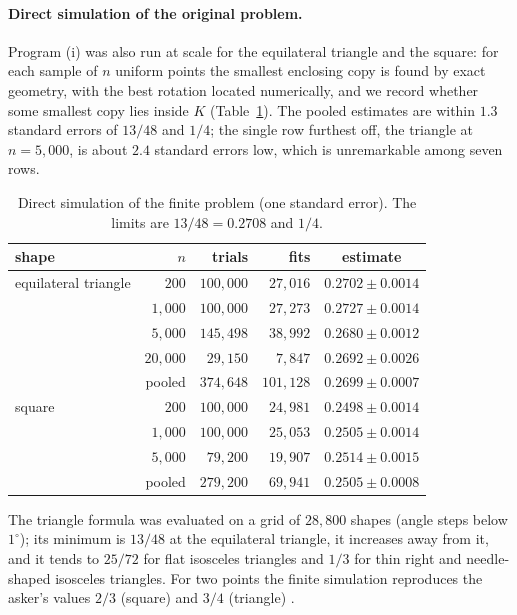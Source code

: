 \documentclass[11pt]{amsart}
\theoremstyle{remark}\newtheorem{remark}[theorem]{Remark}
\begin{document}
\paragraph{Direct simulation of the original problem.} Program (i) was also run at scale for the equilateral
triangle and the square: for each sample of $n$ uniform points the smallest enclosing copy is found by exact geometry,
with the best rotation located numerically, and we record whether some smallest copy lies inside $K$
(Table~\ref{tab:direct}). The pooled estimates are within $1.3$ standard errors of $13/48$ and $1/4$; the single
row furthest off, the triangle at $n=5{,}000$, is about $2.4$ standard errors low, which is unremarkable among seven rows.

\begin{table}[ht]
\centering
\begin{tabular}{lrrrc}
\toprule
shape & $n$ & trials & fits & estimate \\
\midrule
equilateral triangle & $200$ & $100{,}000$ & $27{,}016$ & $0.2702\pm0.0014$\\
 & $1{,}000$ & $100{,}000$ & $27{,}273$ & $0.2727\pm0.0014$\\
 & $5{,}000$ & $145{,}498$ & $38{,}992$ & $0.2680\pm0.0012$\\
 & $20{,}000$ & $29{,}150$ & $7{,}847$ & $0.2692\pm0.0026$\\
 & pooled & $374{,}648$ & $101{,}128$ & $0.2699\pm0.0007$\\
\midrule
square & $200$ & $100{,}000$ & $24{,}981$ & $0.2498\pm0.0014$\\
 & $1{,}000$ & $100{,}000$ & $25{,}053$ & $0.2505\pm0.0014$\\
 & $5{,}000$ & $79{,}200$ & $19{,}907$ & $0.2514\pm0.0015$\\
 & pooled & $279{,}200$ & $69{,}941$ & $0.2505\pm0.0008$\\
\bottomrule
\end{tabular}
\caption{Direct simulation of the finite problem (one standard error). The limits are $13/48=0.2708$ and $1/4$.}
\label{tab:direct}
\end{table}

The triangle formula was evaluated on a grid of $28{,}800$ shapes (angle steps below $1^\circ$); its minimum
is $13/48$ at the equilateral triangle, it increases away from it, and it tends to $25/72$ for flat isosceles triangles and $1/3$ for thin right and needle-shaped isosceles
triangles. For two points the finite simulation reproduces the asker's values
$2/3$ (square) and $3/4$ (triangle) \cite{mo}.
\end{document}
